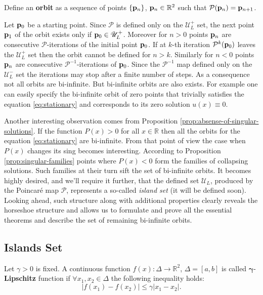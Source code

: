 \begin{definition}
	Define an {\bf orbit} as a sequence of points $\{ \vb{p}_n \}$, $\vb{p}_n \in \mathbb{R}^2$ such that $\mathcal{P}(\vb{p}_n) = \vb{p}_{n+1}$.
\label{def:orbit}
\end{definition}

Let $\vb{p}_0$ be a starting point.
Since $\mathcal{P}$ is defined only on the $\mathscr{U}_L^+$ set, the next point $\vb{p}_1$ of the orbit exists only if $\vb{p}_0 \in \mathscr{U}_L^+$.
Moreover for $n > 0$ points $\vb{p}_n$ are consecutive $\mathcal{P}$-iterations of the initial point $\vb{p}_0$.
If at $k$-th iteration $\mathcal{P}^k(\vb{p}_0)$ leaves the $\mathscr{U}_L^+$ set then the orbit cannot be defined for $n > k$.
Similarly for $n < 0$ points $\vb{p}_n$ are consecutive $\mathcal{P}^{-1}$-iterations of $\vb{p}_0$.
Since the $\mathcal{P}^{-1}$ map defined only on the $\mathscr{U}_L^-$ set the iterations may stop after a finite number of steps.
As a consequence not all orbits are bi-infinite.
But bi-infinite orbits are also exists.
For example one can easily specify the bi-infinite orbit of zero points that trivially satisfies the equation \eqref{eq:stationary} and corresponds to its zero solution $u(x) \equiv 0$.

Another interesting observation comes from Proposition \ref{prop:absense-of-singular-solutions}.
If the function $P(x) > 0$ for all $x \in \mathbb{R}$ then all the orbits for the equation \eqref{eq:stationary} are bi-infinite.
From that point of view the case when $P(x)$ changes its sing becomes interesting.
According to Proposition \ref{prop:singular-families} points where $P(x) < 0$ form the families of collapsing solutions.
Such families at their turn sift the set of bi-infinite orbits.
It becomes highly desired, and we'll require it further, that the defined set $\mathscr{U}_L$, produced by the Poincar\'e map $\mathcal{P}$, represents a so-called {\it island set}  \cite{AlfimovAvramenko} (it will be defined soon).
Looking ahead, such structure along with additional properties clearly reveals the horseshoe structure and allows us to formulate and prove all the essential theorems and describe the set of remaining bi-infinite orbits. 

\subsection{Islands Set}

\begin{definition}
	Let $\gamma > 0$ is fixed.
	A continuous function $f(x): \Delta \to \mathbb{R}^2$, $\Delta = [a, b]$ is called $\bm{\gamma}$-{\bf Lipschitz} function if $\forall x_1, x_2 \in \Delta$ the following inequality holds:
	\begin{equation}
		|f(x_1) - f(x_2)| \le \gamma |x_1 - x_2|.
	\end{equation}
\end{definition}

